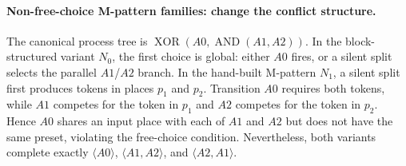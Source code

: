 \documentclass[manuscript,screen,nonacm]{acmart}
\begin{document}
\paragraph{Non-free-choice M-pattern families: change the conflict structure.}
The canonical process tree is
$\operatorname{XOR}(A0,\operatorname{AND}(A1,A2))$. In the block-structured
variant $N_0$, the first choice is global: either $A0$ fires, or a silent split
selects the parallel $A1$/$A2$ branch. In the hand-built M-pattern $N_1$, a
silent split first produces tokens in places $p_1$ and $p_2$. Transition $A0$
requires both tokens, while $A1$ competes for the token in $p_1$ and $A2$
competes for the token in $p_2$. Hence $A0$ shares an input place with each of
$A1$ and $A2$ but does not have the same preset, violating the free-choice
condition. Nevertheless, both variants complete exactly
$\langle A0\rangle$, $\langle A1,A2\rangle$, and
$\langle A2,A1\rangle$.
\end{document}
